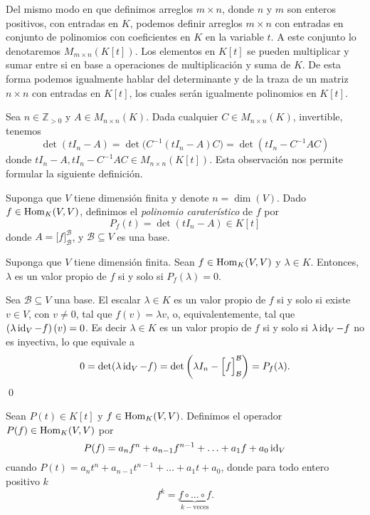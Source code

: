 \begin{obs}
Del mismo modo en que definimos arreglos $m\times n$, donde $n$ y $m$ son enteros positivos, con entradas en $K$, podemos definir arreglos $m\times n$ con entradas en conjunto de polinomios con coeficientes en $K$ en la variable $t$. A este conjunto lo denotaremos $M_{m\times n}(K[t])$. Los elementos en $K[t]$ se pueden multiplicar y sumar entre si en base a operaciones de multiplicaci\'on y suma de $K$. De esta forma podemos igualmente hablar del determinante y de la traza de un matriz $n\times n$ con entradas en $K[t]$, los cuales ser\'an igualmente polinomios en $K[t]$. 
\end{obs}

\begin{obs}
Sea $n\in\mathbb{Z}_{>0}$ y $A\in M_{n\times n}(K)$. Dada cualquier $C\in M_{n\times n}(K)$, invertible, tenemos
\[
\det(t I_n-A)=\det\Big(C^{-1}(t I_n-A)C\Big)=\det(t I_n-C^{-1}AC)
\]
donde $t I_n-A,t I_n-C^{-1}AC\in M_{n\times n}(K[t])$. Esta observaci\'on nos permite formular la siguiente definici\'on.
\end{obs}

\begin{defn}
Suponga que $V$ tiene dimensi\'on finita y denote $n=\dim(V)$. Dado $f\in\operatorname{Hom}_K(V,V)$, definimos el \emph{polinomio carater\'istico} de $f$ por
\[
P_f(t)=\det(t I_n-A)\in K[t]
\]
donde $A=\Big[f\Big]^{\mathcal{B}}_{\mathcal{B}}$, y $\mathcal{B}\subseteq V$ es una base.
\end{defn}

\begin{teo}
Suponga que $V$ tiene dimensi\'on finita. Sean $f\in\operatorname{Hom}_K(V,V)$ y $\lambda\in K$. Entonces, $\lambda$ es un valor propio de $f$ si y solo si $P_f(\lambda)=0$.
\end{teo}

\dem Sea $\mathcal{B}\subseteq V$ una base. El escalar $\lambda\in K$ es un valor propio de $f$ si y solo si existe $v\in V$, con $v\ne 0$, tal que $f(v)=\lambda v$, o, equivalentemente, tal que $\left(\lambda\operatorname{id}_V-f\right)(v)=0$. Es decir $\lambda\in K$ es un valor propio de $f$ si y solo si $\lambda\operatorname{id}_V-f$ no es inyectiva, lo que equivale a
\[
0=\det(\lambda\operatorname{id}_V-f)=\det\left(\lambda I_n-\Big[f\Big]^{\mathcal{B}}_{\mathcal{B}}\right)=P_f(\lambda).
\]
\qed

\begin{defn}
Sean $P(t)\in K[t]$ y $f\in\operatorname{Hom}_K(V,V)$. Definimos el operador $P(f)\in\operatorname{Hom}_K(V,V)$ por
\[
P(f)=a_nf^n+a_{n-1}f^{n-1}+\ldots+a_1f+a_0\operatorname{id}_V
\]
cuando $P(t)=a_nt^n+a_{n-1}t^{n-1}+\ldots+a_1t+a_0$, donde para todo entero positivo $k$
\[
f^k=\underbrace{f\circ\ldots\circ f}_{k-\textrm{veces}}.
\]
\end{defn}


